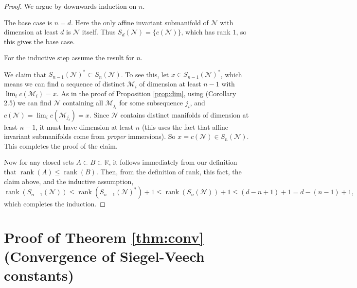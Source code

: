 \documentclass{article}
\theoremstyle{definition}
\begin{document}
\begin{proof}
  We argue by downwards induction on $n$.  

The base case is $n=d$.  Here the only affine invariant submanifold of $\mathcal{N}$ with dimension at least $d$ is $\mathcal{N}$ itself.  Thus $S_d(\mathcal{N})=\{c(\mathcal{N})\}$, which has rank $1$, so this gives the base case.  

For the inductive step assume the result for $n$. 

 We claim that $S_{n-1}(\mathcal{N})^* \subset S_n(\mathcal{N})$.  To see this, let $x\in S_{n-1}(\mathcal{N})^*$, which means we can find a sequence of distinct $\mathcal{M}_i$ of dimension at least $n-1$ with $\lim_i c(\mathcal{M}_i) = x$.  As in the proof of Proposition \ref{prop:dim}, using \cite{emm2015} (Corollary 2.5) we can find $\mathcal{N}$ containing all $\mathcal{M}_{j_i}$ for some subsequence $j_i$, and $c(\mathcal{N}) = \lim_i c(\mathcal{M}_{j_i}) =x$.  Since $\mathcal{N}$ contains distinct manifolds of dimension at least $n-1$, it must have dimension at least $n$ (this uses the fact that affine invariant submanifolds come from \emph{proper} immersions).  So $x=c(\mathcal{N}) \in S_n(\mathcal{N})$.  This completes the proof of the claim.  

Now for any closed sets $A\subset B \subset \mathbb{R}$, it follows immediately from our definition that $\operatorname{rank}(A) \le \operatorname{rank}(B)$.  Then, from the definition of rank, this fact, the claim above, and the inductive assumption,
$$\operatorname{rank}(S_{n-1}(\mathcal{N})) \le \operatorname{rank}(S_{n-1}(\mathcal{N})^*)+1 \le \operatorname{rank}(S_n(\mathcal{N})) +1 \le (d-n+1) + 1 = d-(n-1)+1,$$
which completes the induction.  
\end{proof}


\section{Proof of Theorem \ref{thm:conv} (Convergence of Siegel-Veech constants)}
\label{sec:convergence}
\end{document}
